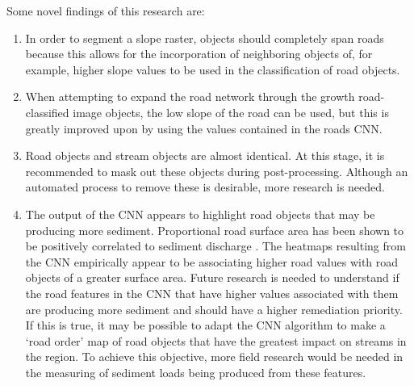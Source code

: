 \documentclass[remotesensing,article,accept,pdftex,moreauthors]{Definitions/mdpi}
\begin{document}
Some novel findings of this research are:
\begin{enumerate}[]
\item In order to segment a slope raster, objects should completely span roads because this allows for the incorporation of neighboring objects of, for example, higher slope values to be used in the classification of road objects.

\item When attempting to expand the road network through the growth road-classified image objects, the low slope of the road can be used, but this is greatly improved upon by using the values contained in the roads CNN.  

\item Road objects and stream objects are almost identical. At this stage, it is recommended to mask out these objects during post-processing. Although an automated process to remove these is desirable, more research is needed.

\item The output of the CNN appears to highlight road objects that may be producing more sediment. Proportional road surface area has been shown to be positively correlated to sediment discharge \cite{reid}. The heatmaps resulting from the CNN empirically appear to be associating higher road values with road objects of a greater surface area. Future research is needed to understand if the road features in the CNN that have higher values associated with them are producing more sediment and should have a higher remediation priority. If this is true, it may be possible to adapt the CNN algorithm to make a ‘road order’ map of road objects that have the greatest impact on streams in the region. To achieve this objective, more field research would be needed in the measuring of sediment loads being produced from these features.  
\end{enumerate}

\vspace{6pt} 




\end{document}
